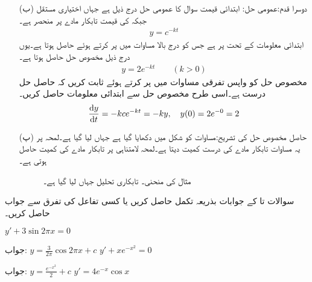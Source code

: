 \begin{itemize}
\item[(ب)]
دوسرا قدم:عمومی حل: \quad ابتدائی قیمت سوال کا عمومی حل درج ذیل ہے جہاں  اختیاری مستقل جبکہ  کی قیمت تابکار مادے پر منحصر ہے۔
\begin{align}
y=c^{-kt}
\end{align}
ابتدائی معلومات کے تحت  پر  ہے جس کو درج بالا مساوات میں پر کرتے ہوئے  حاصل ہوتا ہے۔یوں درج ذیل مخصوص حل حاصل ہوتا ہے۔
\begin{align}\label{مساوات_سادہ_اول_مخصوص_تابکاری}
y=2e^{-kt}\quad \quad (k>0)
\end{align} 
مخصوص حل کو واپس تفرقی مساوات میں پر کرتے ہوئے ثابت کریں کہ حاصل حل درست ہے۔اسی طرح مخصوص حل سے ابتدائی معلومات حاصل کریں۔
\begin{align*}
\frac{\dif y}{\dif t}=-k ce^{-kt}=-ky, \quad y(0)=2e^{-0}=2
\end{align*}
%
\item[(پ)]
حاصل مخصوص حل کی تشریح:مساوات  کو شکل  میں دکھایا گیا ہے جہاں  لیا گیا ہے۔لمحہ  پر یہ مساوات تابکار مادے کی درست کمیت دیتا ہے۔لمحہ لامتناہی پر تابکار مادے کی کمیت  حاصل ہوتی ہے۔
\begin{figure}
\centering
{}
\caption{مثال  کی منحنی۔ تابکاری تحلیل  جہاں  لیا گیا ہے۔}
\label{شکل_مثال_اول_سادہ_تابکاری_الف}
\end{figure} 
%
\end{itemize}

سوالات  تا  کے جوابات بذریعہ تکمل حاصل کریں یا کسی تفاعل کی تفرق سے جواب حاصل کریں۔

\quad
$y'+3\sin 2\pi x=0$

جواب:\quad
  $y=\frac{3}{2\pi} \cos 2\pi x+c$
\quad
$y'+xe^{-x^2}=0$

جواب:\quad
$y=\tfrac{e^{-x^2}}{2}+c$
\quad
$y'=4e^{-x}\cos x$

